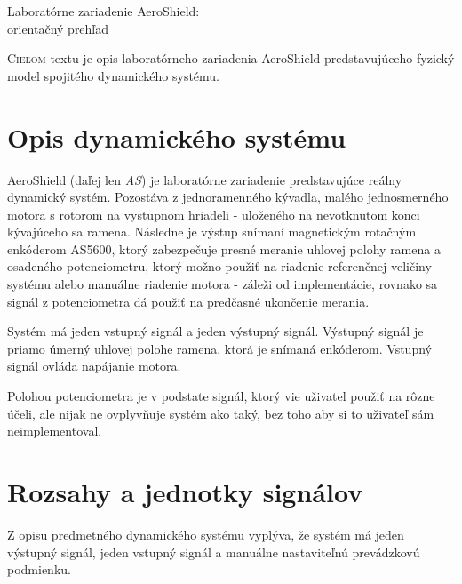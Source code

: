 \documentclass[a4paper, 10pt, ]{article}
\begin{document}
\begin{flushleft}
    Laboratórne zariadenie AeroShield:\\ orientačný prehľad
\end{flushleft}

\bigskip

\normalsize
\normalfont

\lstset{style=mystyle}










\noindent
\lettrine[lines=1, nindent=1pt, loversize=0.0]{C}{ieľom}
textu je opis laboratórneho zariadenia AeroShield predstavujúceho fyzický model spojitého dynamického systému.


\section{Opis dynamického systému}

AeroShield (daľej len \emph{AS}) je laboratórne zariadenie predstavujúce reálny dynamický systém. Pozostáva z jednoramenného kývadla, malého jednosmerného motora s rotorom na vystupnom hriadeli - uloženého na nevotknutom konci kývajúceho sa ramena. Následne je výstup snímaní magnetickým rotačným enkóderom AS5600, ktorý zabezpečuje presné meranie uhlovej polohy ramena a osadeného potenciometru, ktorý možno použiť na riadenie referenčnej veličiny systému alebo manuálne riadenie motora - záleži od implementácie, rovnako sa signál z potenciometra dá použiť na predčasné ukončenie merania.

Systém má jeden vstupný signál a jeden výstupný signál. Výstupný signál je priamo úmerný uhlovej polohe ramena, ktorá je snímaná enkóderom. Vstupný signál ovláda napájanie motora.

Polohou potenciometra je v podstate signál, ktorý vie uživateľ použiť na rôzne účeli, ale nijak ne ovplyvňuje systém ako taký, bez toho aby si to uživateľ sám neimplementoval.



\section{Rozsahy a jednotky signálov}

Z opisu predmetného dynamického systému vyplýva, že systém má jeden výstupný signál, jeden vstupný signál a manuálne nastaviteľnú prevádzkovú podmienku.
\end{document}
